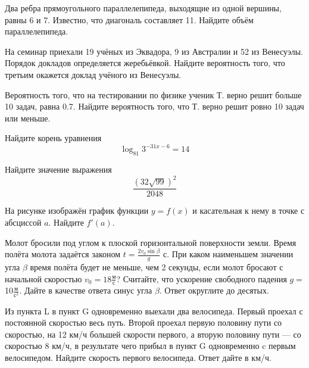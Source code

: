 \documentclass[twocolumn]{article}
\begin{document}
\begin{taskBN}{2}
Два ребра прямоугольного параллелепипеда, выходящие из одной вершины, равны 6 и 7. Известно, что диагональ составляет 11. Найдите объём параллелепипеда.
\end{taskBN}

\begin{taskBN}{3}
На семинар приехали 19 учёных из Эквадора, 9 из Австралии и 52 из Венесуэлы. Порядок докладов определяется жеребьёвкой. Найдите вероятность того, что третьим окажется доклад учёного из Венесуэлы.
\end{taskBN}

\begin{taskBN}{4}
Вероятность того, что на тестировании по физике ученик Т. верно решит больше 10 задач, равна 0.7. Найдите вероятность того, что Т. верно решит ровно 10 задач  или меньше.
\end{taskBN}

\begin{taskBN}{5}
Найдите корень уравнения $$\log_{81}{3^{-31x-6}}=14$$
\end{taskBN}

\begin{taskBN}{6}
Найдите значение выражения $$\frac{\left ({32\sqrt{99}}\right )^{2}}{2048}$$
\end{taskBN}

\begin{taskBN}{7}
На рисунке изображён график функции $y=f(x)$ и касательная к нему в точке с абсциссой $a$. Найдите $f'(a)$.\vspace{2.5cm}
\end{taskBN}

\begin{taskBN}{8}
Молот бросили под углом к плоской горизонтальной поверхности земли. Время полёта молота задаётся законом $t=\frac{2v_0\sin\beta}{g}$ с. При каком наименьшем значении угла $\beta$ время полёта будет не меньше, чем 2 секунды,  если молот бросают с начальной скоростью $v_0=18\frac{\mbox{м}}{\mbox{с}}$? Считайте, что ускорение свободного падения $g=$10$\frac{\mbox{м}}{\mbox{с}^2}$. Дайте в качестве ответа синус угла $\beta$. Ответ округлите до десятых.
\end{taskBN}

\begin{taskBN}{9}
Из пункта L в пункт G одновременно выехали два велосипеда. Первый проехал с постоянной скоростью весь путь. Второй проехал первую половину пути со скоростью, на 12 км/ч большей скорости первого, а вторую половину пути — со скоростью 8 км/ч, в результате чего прибыл в пункт G одновременно c первым велосипедом. Найдите скорость первого велосипеда. Ответ дайте в км/ч.
\end{taskBN}
\end{document}
